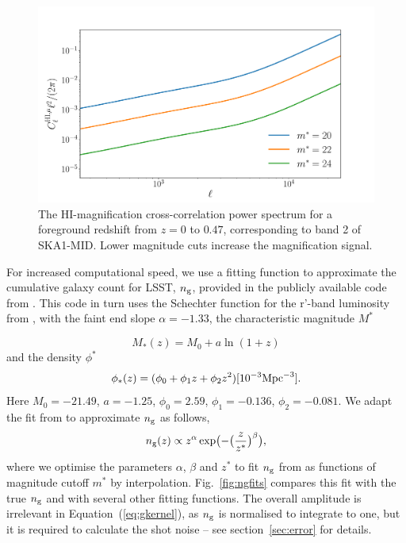 \documentclass[useAMS,usenatbib]{mnras}
\newcommand{\be}{\begin{equation}}
\newcommand{\ee}{\end{equation}}
\begin{document}
\begin{figure}
\centering\includegraphics[width=.9\columnwidth]{HIxmag_Cls.pdf}
\caption{The HI-magnification cross-correlation power spectrum for a foreground redshift from $z=0$ to $0.47$, corresponding to band 2 of SKA1-MID. Lower magnitude cuts increase the magnification signal.}
\label{fig:HIxmag_Cls}
\end{figure}


For increased computational speed, we use a fitting function to approximate the cumulative galaxy count for LSST, $n_{\rm g}$, provided in the publicly available code from \cite{0004-637X-814-2-145}. This code in turn uses the Schechter function \citep{1976ApJ...203..297S} for the r'-band luminosity from \cite{2006A&A...448..101G}, with the faint end slope $\alpha = -1.33$, the characteristic magnitude $M^*$

\be
M_*(z) = M_0 + a \ln (1+z)
\ee
and the density $\phi^*$
\be
\phi_*(z) = (\phi_0 + \phi_1 z + \phi_2 z^2)[10^{-3} {\rm Mpc}^{-3}].
\ee
Here $M_0=-21.49$, $a=-1.25$, $\phi_0=2.59$, $\phi_1 = -0.136$, $\phi_2 = -0.081$.
We adapt the fit from \cite{2009arXiv0912.0201L} to approximate $n_{\rm g}$ as follows,
\be
n_{\rm g}(z) \propto z^\alpha \exp \bigl( -\bigl(\frac{z}{z^*}\bigr)^\beta \bigr),
\label{eq:ngfit}
\ee
where we optimise the parameters $\alpha$, $\beta$ and $z^*$ to fit $n_{\rm g}$ from \cite{0004-637X-814-2-145} as functions of magnitude cutoff $m^*$ by interpolation. Fig.~\ref{fig:ngfits} compares this fit with the true $n_{\rm g}$ and with several other fitting functions.  The overall amplitude is irrelevant in Equation~(\ref{eq:gkernel}), as $n_{\rm g}$ is normalised to integrate to one, but it is required to calculate the shot noise -- see section~\ref{sec:error} for details.
\end{document}
